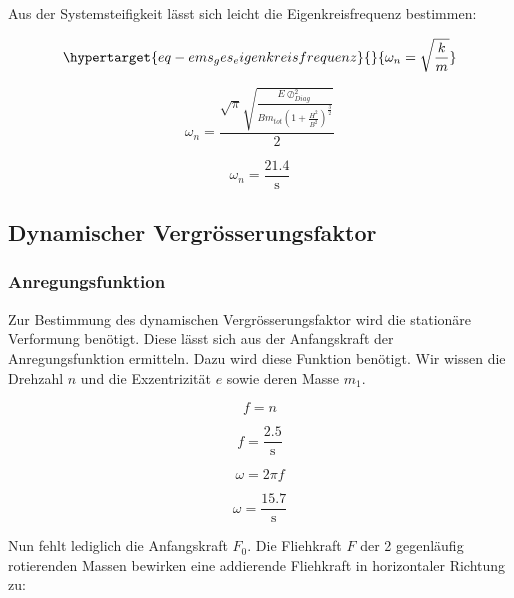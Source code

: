 \documentclass[
  letterpaper,
  DIV=11]{scrreprt}
\begin{document}
Aus der Systemsteifigkeit lässt sich leicht die Eigenkreisfrequenz
bestimmen:

\begin{equation}\protect\hypertarget{eq-ems_ges_eigenkreisfrequenz}{}{
\omega_n =\sqrt{\frac{k}{m}}
}\label{eq-ems_ges_eigenkreisfrequenz}\end{equation}

\begin{equation}\omega_{n} = \frac{\sqrt{\pi} \sqrt{\frac{E \oslash_{Diag}^{2}}{B m_{tot} \left(1 + \frac{H^{2}}{B^{2}}\right)^{\frac{3}{2}}}}}{2}\end{equation}

\begin{equation}\omega_{n} = \frac{21.4}{\text{s}}\end{equation}

\hypertarget{dynamischer-vergruxf6sserungsfaktor}{%
\subsection{Dynamischer
Vergrösserungsfaktor}\label{dynamischer-vergruxf6sserungsfaktor}}

\hypertarget{anregungsfunktion}{%
\subsubsection{Anregungsfunktion}\label{anregungsfunktion}}

Zur Bestimmung des dynamischen Vergrösserungsfaktor wird die stationäre
Verformung benötigt. Diese lässt sich aus der Anfangskraft der
Anregungsfunktion ermitteln. Dazu wird diese Funktion benötigt. Wir
wissen die Drehzahl \(n\) und die Exzentrizität \(e\) sowie deren Masse
\(m_1\).

\begin{equation}f = n\end{equation}

\begin{equation}f = \frac{2.5}{\text{s}}\end{equation}

\begin{equation}\omega = 2 \pi f\end{equation}

\begin{equation}\omega = \frac{15.7}{\text{s}}\end{equation}

Nun fehlt lediglich die Anfangskraft \(F_0\). Die Fliehkraft \(F\) der 2
gegenläufig rotierenden Massen bewirken eine addierende Fliehkraft in
horizontaler Richtung zu:
\end{document}
